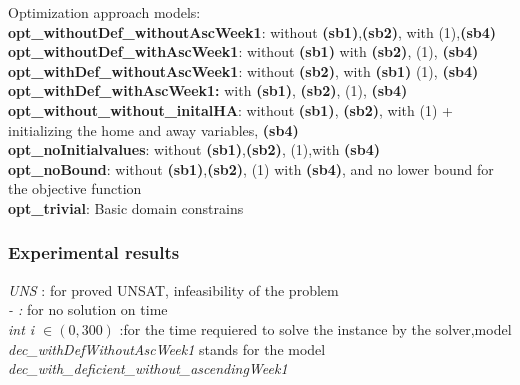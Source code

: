 \documentclass{article}
\begin{document}
Optimization approach models: \\
\textbf{opt\_withoutDef\_withoutAscWeek1}: without \textbf{(sb1)},\textbf{(sb2)}, with (1),\textbf{(sb4)}\\
\textbf{opt\_withoutDef\_withAscWeek1}:  without \textbf{(sb1)} with \textbf{(sb2)}, (1), \textbf{(sb4)}\\
\textbf{opt\_withDef\_withoutAscWeek1}:  without \textbf{(sb2)}, with \textbf{(sb1)} (1), \textbf{(sb4)}\\
\textbf{opt\_withDef\_withAscWeek1:}  with \textbf{(sb1)}, \textbf{(sb2)}, (1), \textbf{(sb4)}\\
\textbf{opt\_without\_without\_initalHA}: without \textbf{(sb1)}, \textbf{(sb2)}, with (1) + initializing the home and away variables, \textbf{(sb4)}\\
\textbf{opt\_noInitialvalues}: without \textbf{(sb1)},\textbf{(sb2)}, (1),with \textbf{(sb4)}\\
\textbf{opt\_noBound}: without \textbf{(sb1)},\textbf{(sb2)}, (1) with \textbf{(sb4)}, and no lower bound for the objective function\\
\textbf{opt\_trivial}: Basic domain constrains

\subsubsection{Experimental results}
\textit{UNS  }: for proved UNSAT, infeasibility of the problem \\
\textit{-  :} for no solution on time \\
\textit{int i $\in (0,300)$ }:for the time requiered to solve the instance by the solver,model\\
\textit{dec\_withDefWithoutAscWeek1} stands for the model \textit{dec\_with\_deficient\_without\_ascendingWeek1 }
\end{document}
